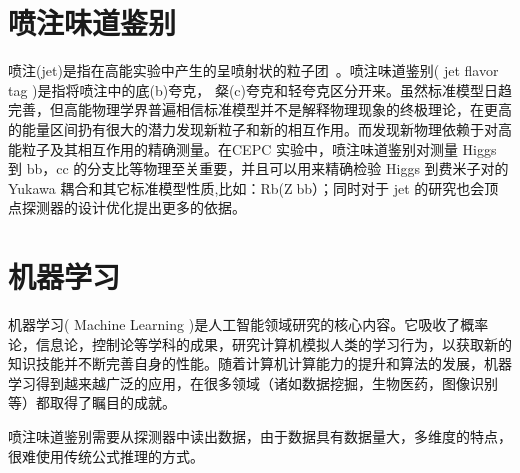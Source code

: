 \section{喷注味道鉴别}
喷注(jet)是指在高能实验中产生的呈喷射状的粒子团~\cite{jet}。喷注味道鉴别( jet flavor tag )是指将喷注中的底(b)夸克， 粲(c)夸克和轻夸克区分开来。虽然标准模型日趋完善，但高能物理学界普遍相信标准模型并不是解释物理现象的终极理论，在更高的能量区间扔有很大的潜力发现新粒子和新的相互作用。而发现新物理依赖于对高能粒子及其相互作用的精确测量。在CEPC 实验中，喷注味道鉴别对测量 Higgs 到 bb，cc 的分支比等物理至关重要，并且可以用来精确检验 Higgs 到费米子对的Yukawa 耦合和其它标准模型性质,比如：Rb(Zbb）；同时对于 jet 的研究也会顶点探测器的设计优化提出更多的依据。

\section{机器学习}
机器学习( Machine Learning )是人工智能领域研究的核心内容。它吸收了概率论，信息论，控制论等学科的成果，研究计算机模拟人类的学习行为，以获取新的知识技能并不断完善自身的性能。随着计算机计算能力的提升和算法的发展，机器学习得到越来越广泛的应用，在很多领域（诸如数据挖掘，生物医药，图像识别等）都取得了瞩目的成就。

喷注味道鉴别需要从探测器中读出数据，由于数据具有数据量大，多维度的特点，很难使用传统公式推理的方式。





